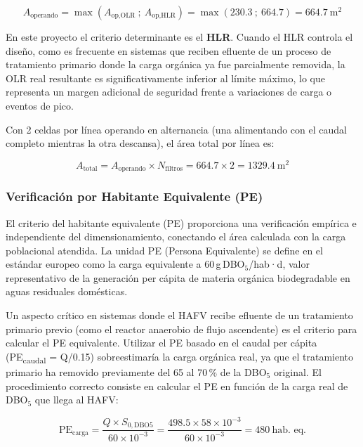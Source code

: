 \documentclass[12pt,a4paper]{article}
\begin{document}
\begin{equation}
A_\text{operando} = \max\!\left(A_\text{op,OLR}\ ;\ A_\text{op,HLR}\right) = \max\!\left(230.3\ ;\ 664.7\right) = 664.7\ \text{m}^2
\end{equation}

En este proyecto el criterio determinante es el \textbf{HLR}. Cuando el HLR controla el diseño, como es frecuente en sistemas que reciben efluente de un proceso de tratamiento primario donde la carga orgánica ya fue parcialmente removida, la OLR real resultante es significativamente inferior al límite máximo, lo que representa un margen adicional de seguridad frente a variaciones de carga o eventos de pico.

Con 2 celdas por línea operando en alternancia (una alimentando con el caudal completo mientras la otra descansa), el área total por línea es:

\begin{equation}
A_\text{total} = A_\text{operando} \times N_\text{filtros} = 664.7 \times 2 = 1329.4\ \text{m}^2
\end{equation}

\subsubsection*{Verificación por Habitante Equivalente (PE)}

El criterio del habitante equivalente (PE) proporciona una verificación empírica e independiente del dimensionamiento, conectando el área calculada con la carga poblacional atendida. La unidad PE (Persona Equivalente) se define en el estándar europeo como la carga equivalente a 60\,g\,DBO$_5$/hab·d, valor representativo de la generación per cápita de materia orgánica biodegradable en aguas residuales domésticas.

Un aspecto crítico en sistemas donde el HAFV recibe efluente de un tratamiento primario previo (como el reactor anaerobio de flujo ascendente) es el criterio para calcular el PE equivalente. Utilizar el PE basado en el caudal per cápita (PE\textsubscript{caudal} = Q/0.15) sobreestimaría la carga orgánica real, ya que el tratamiento primario ha removido previamente del 65 al 70\,\% de la DBO$_5$ original. El procedimiento correcto consiste en calcular el PE en función de la carga real de DBO$_5$ que llega al HAFV:

\begin{equation}
\text{PE}_\text{carga} = \frac{Q \times S_{0,\text{DBO5}}}{60 \times 10^{-3}} = \frac{498.5 \times 58 \times 10^{-3}}{60 \times 10^{-3}} = 480\ \text{hab. eq.}
\end{equation}
\end{document}
